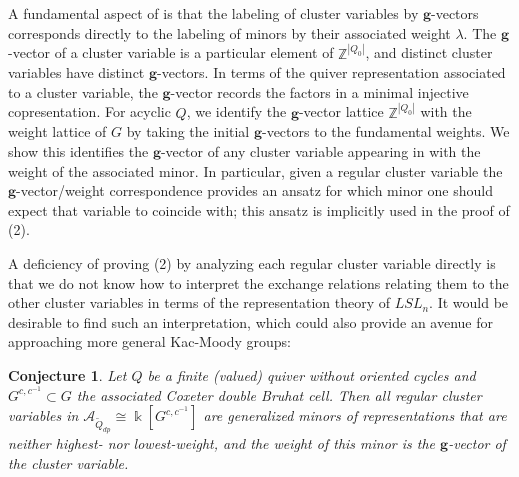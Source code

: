 \documentclass[12pt]{amsart}
\newcommand{\sayDR}[1]{\say[DR]{\color{red}{\bf DR:}\;#1}}
\newcommand{\cA}{\mathcal{A}}
\newcommand{\ZZ}{\mathbb{Z}}
\newcommand{\kk}{\Bbbk}
\newcommand{\bfg}{\mathbf{g}}
\newcommand{\Qdp}{\widetilde{Q}_{dp}}
\newtheorem{conjecture}[theorem]{Conjecture}
\theoremstyle{remark}
\numberwithin{equation}{section}
\numberwithin{figure}{section}
\begin{document}
A fundamental aspect of  is that the labeling of cluster variables by $\bfg$-vectors corresponds directly to the labeling of minors by their associated weight $\lambda$. 
The $\bfg$-vector of a cluster variable is a particular element of $\ZZ^{|Q_0|}$, and distinct cluster variables have distinct $\bfg$-vectors. In terms of the quiver representation associated to a cluster variable, the $\bfg$-vector records the factors in a minimal injective copresentation. 
For acyclic $Q$, we identify the $\bfg$-vector lattice $\ZZ^{|Q_0|}$ with the weight lattice of $G$ by taking the initial $\bfg$-vectors to the fundamental weights.
We show this identifies the $\bfg$-vector of any cluster variable appearing in  with the weight of the associated minor. In particular, given a regular cluster variable the $\bfg$-vector/weight correspondence provides an ansatz for which minor one should expect that variable to coincide with; this ansatz is implicitly used in the proof of (2). 

A deficiency of proving (2) by analyzing each regular cluster variable directly is that we do not know how to interpret the exchange relations relating them to the other cluster variables in terms of the representation theory of $LSL_n$. It would be desirable to find such an interpretation, which could also provide an avenue for approaching more general Kac-Moody groups:


\begin{conjecture}\label{conj:mainconjecture}
  Let $Q$ be a finite (valued) quiver without oriented cycles and $G^{c,c^{-1}} \subset G$ the associated Coxeter double Bruhat cell.
  Then all regular cluster variables in  $\cA_{\Qdp} \cong \kk[G^{c,c^{-1}}]$ are generalized minors of representations that are neither highest- nor lowest-weight, and the weight of this minor is the $\bfg$-vector of the cluster variable.
\end{conjecture}
\end{document}
